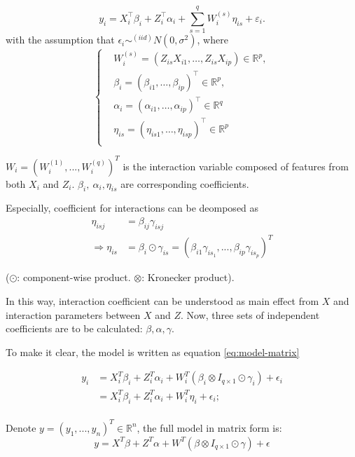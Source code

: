 \documentclass[12pt, a4paper, oneside]{article}
\numberwithin{equation}{section}
\begin{document}
\begin{equation}
	\label{eq:model1}
	y_{i}=X_{i}^{\top} \beta_{i}+Z_{i}^{\top} \alpha_{i}+\sum_{s=1}^{q} W_{i}^{(s)} \eta_{i s}+\varepsilon_{i}.
\end{equation}
with the assumption that $\epsilon_i \sim^{(iid)} N(0, \sigma^2)$,
where
\begin{equation}
	\left\{
	\begin{aligned}
		&W_{i}^{(s)}=\left(Z_{i s} X_{i 1}, \ldots, Z_{i s} X_{i p}\right)\in \mathbb{R}^{p}, \\ &\beta_{i}=\left(\beta_{i 1}, \ldots, \beta_{i p}\right)^{\top}\in \mathbb{R}^{p}, \\ &\alpha_{i}=\left(\alpha_{i 1}, \ldots, \alpha_{i p}\right)^{\top}\in \mathbb{R}^{q} \\
		&\eta_{i s}=\left(\eta_{i s 1}, \ldots, \eta_{i s p}\right)^{\top}\in \mathbb{R}^{p} \\
	\end{aligned}
	\right.
	\nonumber
\end{equation}

$W_{i} = (W_{i}^{(1)},...,W_{i}^{(q)})^{T}$ is the interaction variable composed of features from both $X_i$ and $Z_i$. $\beta_i,\ \alpha_i,\eta_{is}$ are corresponding coefficients. 

Especially, coefficient for interactions can be deomposed as 
\begin{equation}
	\begin{aligned}
		\eta_{isj} &= \beta_{ij}\gamma_{isj} \\
		\Rightarrow \eta_{is} &= \beta_i \odot \gamma_{is} = (\beta_{i1}\gamma_{is_1},...,\beta_{ip}\gamma_{is_p}) ^{T}
	\end{aligned}
\end{equation}

($\odot$: component-wise product. $\otimes$: Kronecker product). 

In this way, interaction coefficient can be understood as main effect from $X$ and interaction parameters between $X$ and $Z$. Now, three sets of independent coefficients are to be calculated: $\beta, \alpha, \gamma$.

To make it clear, the model is written as equation \ref{eq:model-matrix}

\begin{equation}
	\label{eq:model-matrix}
	\begin{aligned}
		y_i &= X_i^T\beta_i + Z_i^T\alpha_i + W_i^{T}(\beta_i \otimes I_{q\times 1}\odot \gamma_i) + \epsilon_i \\
		&= X_i^T\beta_i + Z_i^T\alpha_i + W_i^{T}\eta_i + \epsilon_i;
	\end{aligned}
\end{equation}
\\
Denote $y = (y_1, ..., y_n)^T\in \mathbb{R}^n$, the full model in matrix form is:
\begin{equation}
	\label{eq:model-matrix-full}
	y = X^T\beta + Z^{T}\alpha + W^T(\beta \otimes I_{q\times 1}\odot \gamma) + \epsilon
\end{equation}
\end{document}
